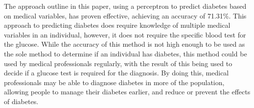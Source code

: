 \documentclass[10pt,twocolumn,a4paper]{article}
\begin{document}
The approach outline in this paper, using a perceptron to predict diabetes based on medical variables, has proven effective, achieving an accuracy of 71.31\%. This approach to predicting diabetes does require knowledge of multiple medical variables in an individual, however, it does not require the specific blood test for the glucose. While the accuracy of this method is not high enough to be used as the sole method to determine if an individual has diabetes, this method could be used by medical professionals regularly, with the result of this being used to decide if a glucose test is required for the diagnosis. By doing this, medical professionals may be able to diagnose diabetes in more of the population, allowing people to manage their diabetes earlier, and reduce or prevent the effects of diabetes.


{\small


}
\end{document}
